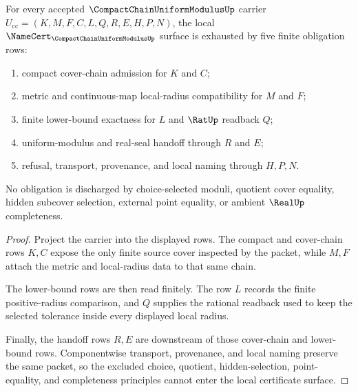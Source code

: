 \begin{theorem}
\label{thm:compact-chain-uniform-modulus-namecert-obligations}
For every accepted $\CompactChainUniformModulusUp$ carrier $U_{\mathrm{cc}}=(K,M,F,C,L,Q,R,E,H,P,N)$, the local $\NameCert_{\CompactChainUniformModulusUp}$ surface is exhausted by five finite obligation rows:
\begin{enumerate}
  \item compact cover-chain admission for $K$ and $C$;
  \item metric and continuous-map local-radius compatibility for $M$ and $F$;
  \item finite lower-bound exactness for $L$ and $\RatUp$ readback $Q$;
  \item uniform-modulus and real-seal handoff through $R$ and $E$;
  \item refusal, transport, provenance, and local naming through $H,P,N$.
\end{enumerate}
No obligation is discharged by choice-selected moduli, quotient cover equality, hidden subcover selection, external point equality, or ambient $\RealUp$ completeness.
\end{theorem}
\begin{proof}
Project the carrier into the displayed rows. The compact and cover-chain rows $K,C$ expose the only finite source cover inspected by the packet, while $M,F$ attach the metric and local-radius data to that same chain.

The lower-bound rows are then read finitely. The row $L$ records the finite positive-radius comparison, and $Q$ supplies the rational readback used to keep the selected tolerance inside every displayed local radius.

Finally, the handoff rows $R,E$ are downstream of those cover-chain and lower-bound rows. Componentwise transport, provenance, and local naming preserve the same packet, so the excluded choice, quotient, hidden-selection, point-equality, and completeness principles cannot enter the local certificate surface.
\end{proof}

